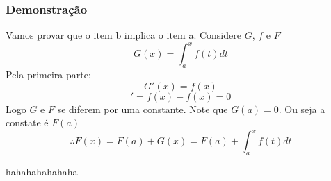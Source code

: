 \documentclass{article}
\begin{document}
    \subsubsection*{Demonstração}
    Vamos provar que o item b implica o item a. Considere $G$, $f$ e
    $F$
    \begin{equation*}
        G(x) = \int_{a}^{x}f(t)dt
    \end{equation*}
    Pela primeira parte:
    \begin{equation*}
        G'(x) = f(x)
    \end{equation*}
    \begin{equation*}
        [F(x) - G(x)]' = f(x) - f(x) = 0
    \end{equation*}
    Logo $G$ e $F$ se diferem por uma constante. Note que $G(a) = 0$.
    Ou seja a constate é $F(a)$ 
    \begin{equation*}
        \therefore F(x) = F(a) + G(x) = F(a) + \int_{a}^{x}f(t)dt
    \end{equation*}

    hahahahahahaha
\end{document}
